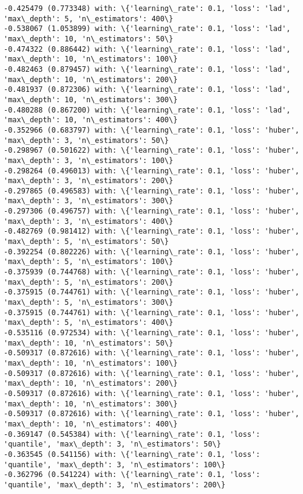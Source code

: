 \documentclass[11pt]{article}
\begin{document}
\begin{Verbatim}[commandchars=\\\{\}]
-0.425479 (0.773348) with: \{'learning\_rate': 0.1, 'loss': 'lad', 'max\_depth': 5, 'n\_estimators': 400\}
-0.538067 (1.053899) with: \{'learning\_rate': 0.1, 'loss': 'lad', 'max\_depth': 10, 'n\_estimators': 50\}
-0.474322 (0.886442) with: \{'learning\_rate': 0.1, 'loss': 'lad', 'max\_depth': 10, 'n\_estimators': 100\}
-0.482463 (0.879457) with: \{'learning\_rate': 0.1, 'loss': 'lad', 'max\_depth': 10, 'n\_estimators': 200\}
-0.481937 (0.872306) with: \{'learning\_rate': 0.1, 'loss': 'lad', 'max\_depth': 10, 'n\_estimators': 300\}
-0.480288 (0.867200) with: \{'learning\_rate': 0.1, 'loss': 'lad', 'max\_depth': 10, 'n\_estimators': 400\}
-0.352966 (0.683797) with: \{'learning\_rate': 0.1, 'loss': 'huber', 'max\_depth': 3, 'n\_estimators': 50\}
-0.298967 (0.501622) with: \{'learning\_rate': 0.1, 'loss': 'huber', 'max\_depth': 3, 'n\_estimators': 100\}
-0.298264 (0.496013) with: \{'learning\_rate': 0.1, 'loss': 'huber', 'max\_depth': 3, 'n\_estimators': 200\}
-0.297865 (0.496583) with: \{'learning\_rate': 0.1, 'loss': 'huber', 'max\_depth': 3, 'n\_estimators': 300\}
-0.297306 (0.496757) with: \{'learning\_rate': 0.1, 'loss': 'huber', 'max\_depth': 3, 'n\_estimators': 400\}
-0.482769 (0.981412) with: \{'learning\_rate': 0.1, 'loss': 'huber', 'max\_depth': 5, 'n\_estimators': 50\}
-0.392254 (0.802226) with: \{'learning\_rate': 0.1, 'loss': 'huber', 'max\_depth': 5, 'n\_estimators': 100\}
-0.375939 (0.744768) with: \{'learning\_rate': 0.1, 'loss': 'huber', 'max\_depth': 5, 'n\_estimators': 200\}
-0.375915 (0.744761) with: \{'learning\_rate': 0.1, 'loss': 'huber', 'max\_depth': 5, 'n\_estimators': 300\}
-0.375915 (0.744761) with: \{'learning\_rate': 0.1, 'loss': 'huber', 'max\_depth': 5, 'n\_estimators': 400\}
-0.535116 (0.972534) with: \{'learning\_rate': 0.1, 'loss': 'huber', 'max\_depth': 10, 'n\_estimators': 50\}
-0.509317 (0.872616) with: \{'learning\_rate': 0.1, 'loss': 'huber', 'max\_depth': 10, 'n\_estimators': 100\}
-0.509317 (0.872616) with: \{'learning\_rate': 0.1, 'loss': 'huber', 'max\_depth': 10, 'n\_estimators': 200\}
-0.509317 (0.872616) with: \{'learning\_rate': 0.1, 'loss': 'huber', 'max\_depth': 10, 'n\_estimators': 300\}
-0.509317 (0.872616) with: \{'learning\_rate': 0.1, 'loss': 'huber', 'max\_depth': 10, 'n\_estimators': 400\}
-0.369147 (0.545384) with: \{'learning\_rate': 0.1, 'loss': 'quantile', 'max\_depth': 3, 'n\_estimators': 50\}
-0.363545 (0.541156) with: \{'learning\_rate': 0.1, 'loss': 'quantile', 'max\_depth': 3, 'n\_estimators': 100\}
-0.362796 (0.541224) with: \{'learning\_rate': 0.1, 'loss': 'quantile', 'max\_depth': 3, 'n\_estimators': 200\}

\end{Verbatim}
\end{document}
